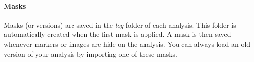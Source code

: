 \paragraph{Masks\\\newline}
\label{par:Masks}
\newline
\indent Masks (or versions) are saved in the \textit{log} folder of each analysis. This folder is automatically created when the first mask is applied. A mask is then saved whenever markers or images are hide on the analysis. You can always load an old version of your analysis by importing one of these masks.
